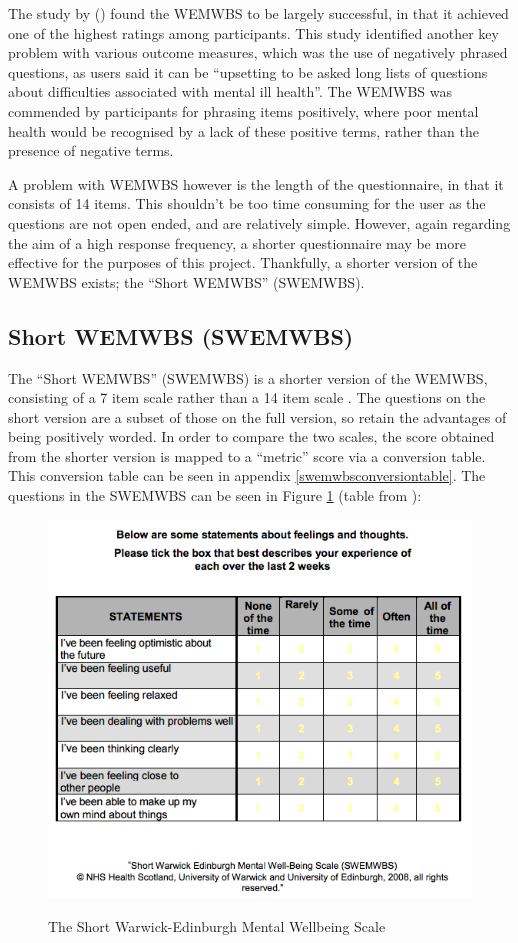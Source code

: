 \documentclass[11pt,openright,a4paper]{report}
\begin{document}
The study by \citeauthor{crawford2011selecting} (\citeyear{crawford2011selecting}) found the WEMWBS to be largely successful, in that it achieved one of the highest ratings among participants. This study identified another key problem with various outcome measures, which was the use of negatively phrased questions, as users said it can be \enquote{upsetting to be asked long lists of questions about difficulties associated with mental ill health}. The WEMWBS was commended by participants for phrasing items positively, where poor mental health would be recognised by a lack of these positive terms, rather than the presence of negative terms.

A problem with WEMWBS however is the length of the questionnaire, in that it consists of 14 items. This shouldn't be too time consuming for the user as the questions are not open ended, and are relatively simple. However, again regarding the aim of a high response frequency, a shorter questionnaire may be more effective for the purposes of this project. Thankfully, a shorter version of the WEMWBS exists; the \enquote{Short WEMWBS} (SWEMWBS).

\subsection{Short WEMWBS (SWEMWBS)} \label{swemwbssection}
The \enquote{Short WEMWBS} (SWEMWBS) is a shorter version of the WEMWBS, consisting of a 7 item scale rather than a 14 item scale \parencite{swemwbs}. The questions on the short version are a subset of those on the full version, so retain the advantages of being positively worded. In order to compare the two scales, the score obtained from the shorter version is mapped to a \enquote{metric} score via a conversion table. This conversion table can be seen in appendix \ref{swemwbsconversiontable}.
\newpage
The questions in the SWEMWBS can be seen in Figure \ref{fig:swemwbs} (table from \parencite{swemwbsquestions}):
\begin{figure}[ht]
\centering
\caption{The Short Warwick-Edinburgh Mental Wellbeing Scale}
\includegraphics[width=.8\textwidth]{i/swemwbs.png}
\label{fig:swemwbs}
\end{figure}
\end{document}
